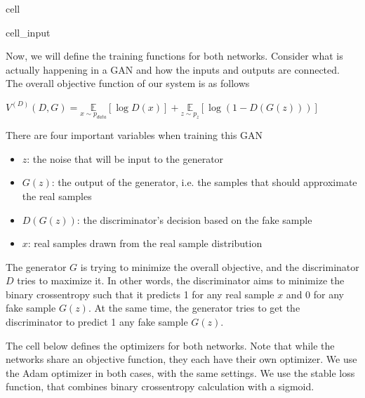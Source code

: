 \documentclass[letterpaper,10pt,english]{jupyterBook}
\begin{document}
\begin{sphinxuseclass}{cell}
\begin{sphinxVerbatimInput}
\begin{sphinxuseclass}{cell_input}
\begin{sphinxVerbatim}[commandchars=\\\{\}]
      
         
\end{sphinxVerbatim}

\end{sphinxuseclass}\end{sphinxVerbatimInput}

\end{sphinxuseclass}
\sphinxAtStartPar
Now, we will define the training functions for both networks. Consider what is actually happening in a GAN and how the inputs and outputs are connected. The overall objective function of our system is as follows

\sphinxAtStartPar
\(V^{(D)}(D,G)=\underset{x\sim p_{data}}{\mathbb{E}} [\log{D(x)}]+\underset{z\sim p_z}{\mathbb{E}} [\log{(1-D(G(z)))}]\)

\sphinxAtStartPar
There are four important variables when training this GAN
\begin{itemize}
\item {} 
\sphinxAtStartPar
\(z\): the noise that will be input to the generator

\item {} 
\sphinxAtStartPar
\(G(z)\): the output of the generator, i.e. the samples that should approximate the real samples

\item {} 
\sphinxAtStartPar
\(D(G(z))\): the discriminator’s decision based on the fake sample

\item {} 
\sphinxAtStartPar
\(x\): real samples drawn from the real sample distribution

\end{itemize}

\sphinxAtStartPar
The generator \(G\) is trying to minimize the overall objective, and the discriminator \(D\) tries to maximize it. In other words, the discriminator aims to minimize the binary cross\sphinxhyphen{}entropy such that it predicts 1 for any real sample \(x\) and 0 for any fake sample \(G(z)\). At the same time, the generator tries to get the discriminator to predict 1 any fake sample \(G(z)\).

\sphinxAtStartPar
The cell below defines the optimizers for both networks. Note that while the networks share an objective function, they each have their own optimizer. We use the Adam optimizer in both cases, with the same settings. We use the stable  loss function, that combines binary cross\sphinxhyphen{}entropy calculation with a sigmoid.
\end{document}

